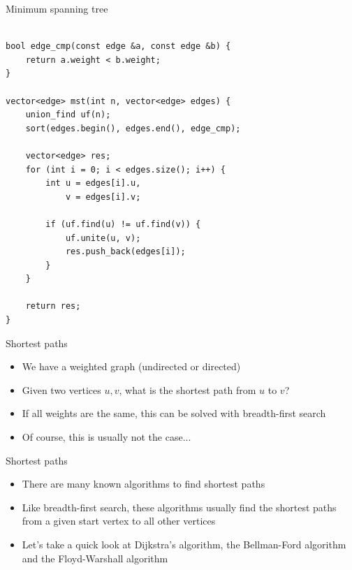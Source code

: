 \documentclass{beamer}
\begin{document}
\begin{frame}{Minimum spanning tree}
    \begin{verbatim}

bool edge_cmp(const edge &a, const edge &b) {
    return a.weight < b.weight;
}

vector<edge> mst(int n, vector<edge> edges) {
    union_find uf(n);
    sort(edges.begin(), edges.end(), edge_cmp);

    vector<edge> res;
    for (int i = 0; i < edges.size(); i++) {
        int u = edges[i].u,
            v = edges[i].v;

        if (uf.find(u) != uf.find(v)) {
            uf.unite(u, v);
            res.push_back(edges[i]);
        }
    }

    return res;
}
    \end{verbatim}
\end{frame}

\begin{frame}[plain]{Shortest paths}
    \begin{itemize}
        \item We have a weighted graph (undirected or directed)
        \item Given two vertices $u,v$, what is the shortest path from $u$ to $v$?
        \vspace{10pt}
        \item If all weights are the same, this can be solved with breadth-first search
        \item Of course, this is usually not the case...
    \end{itemize}
\end{frame}

\begin{frame}[plain]{Shortest paths}
    \begin{itemize}
        \item There are many known algorithms to find shortest paths
        \item Like breadth-first search, these algorithms usually find the shortest paths from a given start vertex to all other vertices
        \vspace{5pt}
        \item Let's take a quick look at Dijkstra's algorithm, the Bellman-Ford algorithm and the Floyd-Warshall algorithm
    \end{itemize}
\end{frame}
\end{document}
